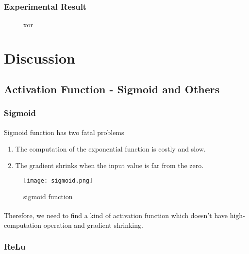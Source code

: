\subsubsection{Experimental Result}
\begin{figure}[!ht]
    \centering
    \qquad
    \qquad
    \qquad
    \caption{xor}
\end{figure}

\newpage
\section{Discussion}
\subsection{Activation Function - Sigmoid and Others}
\subsubsection{Sigmoid}
\paragraph{}
Sigmoid function has two fatal problems
\begin{enumerate}
    \item The computation of the exponential function is costly and slow.
    \item The gradient shrinks when the input value is far from the zero. 
\end{enumerate}
\begin{figure}[!ht]
\begin{center} 
\texttt{[image: sigmoid.png]} 
\caption{sigmoid function}
\end{center} 
\end{figure}
\paragraph{}
Therefore, we need to find a kind of activation function which doesn't have high-computation operation and gradient shrinking. 
\subsubsection{ReLu}
